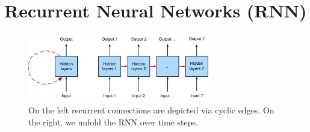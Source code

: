 \chapter{Recurrent Neural Networks (RNN)} \label{chapter: Recurrent Neural Networks (RNN)}


\begin{figure}[H]
    \centering
    \includegraphics[width=\linewidth, height=3cm, keepaspectratio]{Pictures/Recurrent-Neural-Networks/unfolded-rnn.jpg}
    \caption*{On the left recurrent connections are depicted via cyclic edges. On the right, we unfold the RNN over time steps.}
\end{figure}


